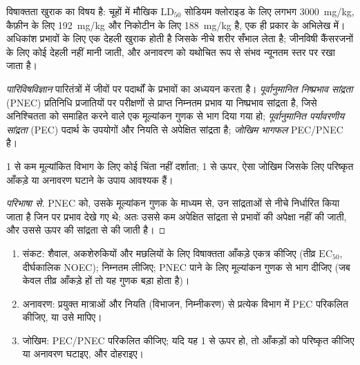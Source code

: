 विषाक्तता खुराक का विषय है: चूहों में मौखिक $\mathrm{LD_{50}}$ सोडियम क्लोराइड के लिए लगभग \qty{3000}{mg/kg},
कैफ़ीन के लिए \qty{192}{mg/kg} और निकोटीन के लिए \qty{188}{mg/kg} है, एक ही प्रकार के अभिलेख में। अधिकांश प्रभावों के लिए एक
देहली खुराक होती है जिसके नीचे शरीर सँभाल लेता है; जीनविषी कैंसरजनों के लिए
कोई देहली नहीं मानी जाती, और अनावरण को यथोचित रूप से संभव न्यूनतम स्तर पर रखा जाता है।

\begin{definition}[पारिविषविज्ञान]\label{def:b3:environmental-toxicology:ecotoxicology}
\emph{पारिविषविज्ञान} पारितंत्रों में जीवों पर पदार्थों के
प्रभावों का अध्ययन करता है। \emph{पूर्वानुमानित निष्प्रभाव
सांद्रता} (PNEC) प्रतिनिधि प्रजातियों पर परीक्षणों से प्राप्त
निम्नतम प्रभाव या निष्प्रभाव सांद्रता है, जिसे
अनिश्चितता को समाहित करने वाले एक मूल्यांकन गुणक से भाग दिया गया हो;
\emph{पूर्वानुमानित पर्यावरणीय सांद्रता}
(PEC) पदार्थ के उपयोगों और नियति से अपेक्षित सांद्रता है;
\emph{जोखिम भागफल} PEC/PNEC है।
\end{definition}

\begin{proposition}[जोखिम भागफल]\label{prop:b3:environmental-toxicology:risk-quotient}
1 से कम  मूल्यांकित विभाग के लिए कोई चिंता नहीं दर्शाता; 1 से
ऊपर, ऐसा जोखिम जिसके लिए परिष्कृत आँकड़े या अनावरण घटाने के उपाय आवश्यक हैं।
\end{proposition}

\begin{proof}[परिभाषा से]
PNEC को, उसके मूल्यांकन गुणक के माध्यम से, उन सांद्रताओं से नीचे निर्धारित किया जाता है जिन पर
प्रभाव देखे गए थे; अतः उससे कम अपेक्षित सांद्रता से प्रभावों की
अपेक्षा नहीं की जाती, और उससे ऊपर की सांद्रता से की जाती है।
\end{proof}

\begin{method}[एक पर्यावरणीय जोखिम मूल्यांकन]\label{met:b3:environmental-toxicology:risk}
\begin{enumerate}
  \item संकट: शैवाल, अकशेरुकियों और मछलियों के लिए विषाक्तता आँकड़े एकत्र कीजिए (तीव्र
        $\mathrm{EC_{50}}$, दीर्घकालिक NOEC); निम्नतम लीजिए; PNEC पाने के लिए मूल्यांकन गुणक से भाग दीजिए
        (जब केवल तीव्र आँकड़े हों तो यह गुणक बड़ा होता है)।
  \item अनावरण: प्रयुक्त मात्राओं और नियति (विभाजन, निम्नीकरण) से
        प्रत्येक विभाग में PEC परिकलित कीजिए, या उसे मापिए।
  \item जोखिम: PEC/PNEC परिकलित कीजिए; यदि यह 1 से ऊपर हो, तो आँकड़ों को परिष्कृत कीजिए या
        अनावरण घटाइए, और दोहराइए।
\end{enumerate}
\end{method}

